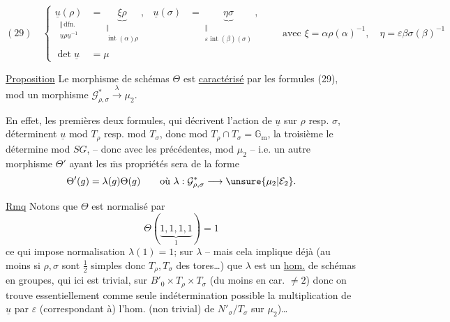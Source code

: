 
\[
(29)\quad
\left\{\begin{aligned}
\underset{\substack{\Vert\,\mathrm{dfn.}\\\underline{u}\rho\underline{u}^{-1}}}{\underline{u}(\rho)}
 &=\underset{\substack{\Vert\\\operatorname{int}(\alpha)\rho}}{\underbrace{\xi\rho}},
 &\underline{u}(\sigma)&=\underset{\substack{\Vert\\\varepsilon\operatorname{int}(\beta)(\sigma)}}{\underbrace{\eta\sigma}},\\[1ex]
\det\underline{u}&=\mu
\end{aligned}\right.
\qquad\text{avec }\xi=\alpha\rho(\alpha)^{-1},\quad
\eta=\varepsilon\beta\sigma(\beta)^{-1}
\]

\uline{Proposition} Le morphisme de schémas $\Theta$ est
\uline{caractérisé} par les formules (29), mod un morphisme
$\mathcal{G}_{\rho,\sigma}^{*}\xrightarrow{\lambda}\mu_2$.

En effet, les premières deux formules, qui décrivent l'action de
$\underline{u}$ sur $\rho$ resp. $\sigma$, déterminent $\underline{u}$ mod
$T_\rho$ resp. mod $T_\sigma$, donc  mod
$T_\rho\cap T_\sigma=\mathbb{G}_{\mathrm m}$, la troisième le détermine
mod $SG$, -- donc avec les précédentes, mod $\mu_2$ -- i.e. un autre
morphisme $\Theta'$ ayant les $\overline{\mathrm m}\mathrm{s}$ propriétés
sera de la forme
\[
\Theta'(g)=\lambda(g)\Theta(g)\qquad\text{où }\lambda:
\mathcal{G}_{\rho,\sigma}^{*}\longrightarrow\unsure{\mu_2|\mathcal{E}_2}.
\]

\uline{Rmq} Notons que  
$\Theta$ est normalisé par
\[
\Theta(\underbrace{1,1,1,1}_{1})=1
\]
ce qui impose  normalisation
$\lambda(1)=1$; sur $\lambda$ -- mais  cela
implique déjà (au moins si $\rho,\sigma$ sont $\frac12$ simples donc
$T_\rho,T_\sigma$ des tores\ldots) que $\lambda$ est un \uline{hom.}
de schémas en groupes, qui ici est  trivial,
sur  $B'_0\times T_\rho\times T_\sigma$
(du moins en car. $\ne2$) donc on trouve essentiellement comme seule
indétermination possible la multiplication  de
$\underline{u}$ par $\varepsilon$ 
(correspondant à) l'hom. (non trivial) de
$N'_\sigma/T_\sigma$ sur $\mu_2$)\ldots\ 

